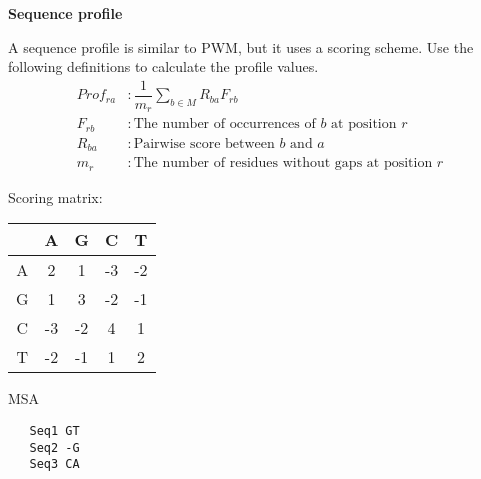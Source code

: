 \question \textbf{Sequence profile}

A sequence profile is similar to PWM, but it uses a scoring scheme. Use the following definitions to calculate the profile values.
\begin{align*}
Prof_{ra} &: \dfrac{1}{m_r} \sum_{b \in M} R_{ba}F_{rb} \\
F_{rb} &: \text{The number of occurrences of } b \text{ at position } r \\
R_{ba} &: \text{Pairwise score between } b \text{ and } a \\
m_r &: \text{The number of residues without gaps at position } r
\end{align*}

Scoring matrix:
\begin{table}[H]
\centering
\begin{tabular}{|c|c|c|c|c|}
\hline
  & A & G & C & T \\ \hline
A &  2 &  1 & -3  & -2  \\ \hline
G &  1 &  3 &  -2 & -1  \\ \hline
C & -3 & -2  & 4  & 1  \\ \hline
T & -2 & -1  & 1  &  2 \\ \hline
\end{tabular}
\end{table}

MSA
\begin{verbatim}
   Seq1 GT
   Seq2 -G
   Seq3 CA
\end{verbatim}

\vspace{0.1 in}

